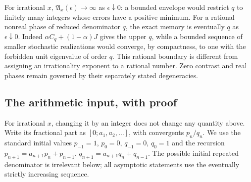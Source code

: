 For irrational $x$, $\mathfrak A_x(\epsilon)\to\infty$ as $\epsilon\downarrow0$: a bounded envelope would restrict $q$ to finitely many integers whose errors have a positive minimum. For a rational nonreal phase of reduced denominator $q$, the exact memory is eventually $q$ as $\epsilon\downarrow0$. Indeed $\alpha C_q+(1-\alpha)J$ gives the upper $q$, while a bounded sequence of smaller stochastic realizations would converge, by compactness, to one with the forbidden unit eigenvalue of order $q$. This rational boundary is different from assigning an irrationality exponent to a rational number. Zero contrast and real phases remain governed by their separately stated degeneracies.

\subsection{The arithmetic input, with proof}
For irrational $x$, changing it by an integer does not change any quantity above. Write its fractional part as $[0;a_1,a_2,\ldots]$, with convergents $p_n/q_n$. We use the standard initial values $p_{-1}=1$, $p_0=0$, $q_{-1}=0$, $q_0=1$ and the recursion
$p_{n+1}=a_{n+1}p_n+p_{n-1}$, $q_{n+1}=a_{n+1}q_n+q_{n-1}$. The possible initial repeated denominator is irrelevant below; all asymptotic statements use the eventually strictly increasing sequence.

